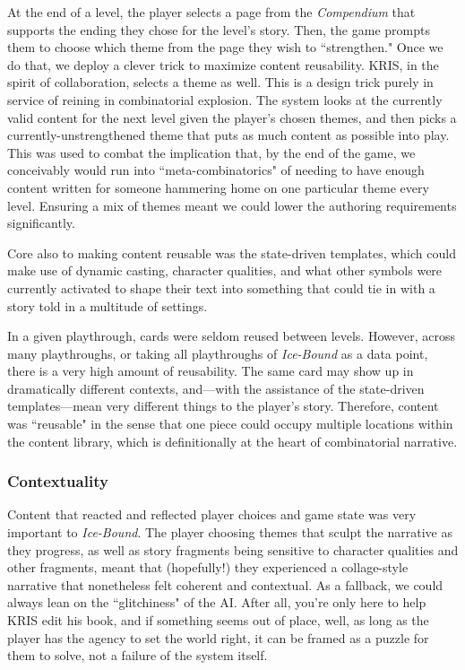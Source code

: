 At the end of a level, the player selects a page from the \textit{Compendium} that supports the ending they chose for the level's story. Then, the game prompts them to choose which theme from the page they wish to ``strengthen." Once we do that, we deploy a clever trick to maximize content reusability. KRIS, in the spirit of collaboration, selects a theme as well. This is a design trick purely in service of reining in combinatorial explosion. The system looks at the currently valid content for the next level given the player's chosen themes, and then picks a currently-unstrengthened theme that puts as much content as possible into play. This was used to combat the implication that, by the end of the game, we conceivably would run into ``meta-combinatorics" of needing to have enough content written for someone hammering home on one particular theme every level. Ensuring a mix of themes meant we could lower the authoring requirements significantly.

Core also to making content reusable was the state-driven templates, which could make use of dynamic casting, character qualities, and what other symbols were currently activated to shape their text into something that could tie in with a story told in a multitude of settings.

In a given playthrough, cards were seldom reused between levels. However, across many playthroughs, or taking all playthroughs of \textit{Ice-Bound} as a data point, there is a very high amount of reusability. The same card may show up in dramatically different contexts, and---with the assistance of the state-driven templates---mean very different things to the player's story. Therefore, content was ``reusable" in the sense that one piece could occupy multiple locations within the content library, which is definitionally at the heart of combinatorial narrative.

\subsubsection{Contextuality}\label{subsubsec:icebound-contextuality}

Content that reacted and reflected player choices and game state was very important to \textit{Ice-Bound}. The player choosing themes that sculpt the narrative as they progress, as well as story fragments being sensitive to character qualities and other fragments, meant that (hopefully!) they experienced a collage-style narrative that nonetheless felt coherent and contextual. As a fallback, we could always lean on the ``glitchiness" of the AI. After all, you're only here to help KRIS edit his book, and if something seems out of place, well, as long as the player has the agency to set the world right, it can be framed as a puzzle for them to solve, not a failure of the system itself.

